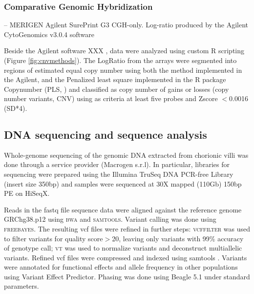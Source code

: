 \subsubsection*{Comparative Genomic Hybridization} 
-- MERIGEN Agilent SurePrint G3 CGH-only. Log-ratio produced by the Agilent CytoGenomics v3.0.4 software 

Beside the Agilent software XXX , data were analyzed using custom R scripting (Figure \ref{fig:cnvmethods}). The LogRatio from the arrays were segmented into regions of estimated equal copy number using both the method implemented in the Agilent, and the Penalized least square implemented in the R package Copynumber (PLS, \cite{nilsen2012copynumber}) and classified as copy number of gains or losses (copy number variants, CNV) using as criteria at least five probes and Zscore $<$0.0016 (SD*4)\cite{vermeesch2005molecular}. 



\subsection*{DNA sequencing and sequence analysis}
Whole-genome sequencing of the genomic DNA extracted from chorionic villi was done through a service provider (Macrogen s.r.l). In particular, libraries for sequencing were prepared using the Illumina TruSeq DNA PCR-free Library (insert size 350bp) and samples were sequenced at 30X mapped (110Gb) 150bp PE on HiSeqX. 

Reads in the fastq file sequence data were aligned against the reference genome GRChg38.p12 using \textsc{bwa}\cite{li2013aligning} and \textsc{samtools}\cite{li2011statistical}. Variant calling was done using \textsc{freebayes}\cite{garrison2012haplotype}. The resulting vcf files were refined in further steps: \textsc{vcffilter} \cite{vcflib} was used to filter variants for quality score$>$20, leaving only variants with 99\% accuracy of genotype call; \textsc{vt}\cite{tan2015unified} was used to normalize variants and deconstruct multiallelic variants. Refined vcf files were compressed and indexed using samtools \cite{li2011statistical}. Variants were annotated for functional effects and allele frequency in other populations using Variant Effect Predictor\cite{mclaren2016ensembl}. Phasing was done using Beagle 5.1\cite{browning2018one} under standard parameters.  



